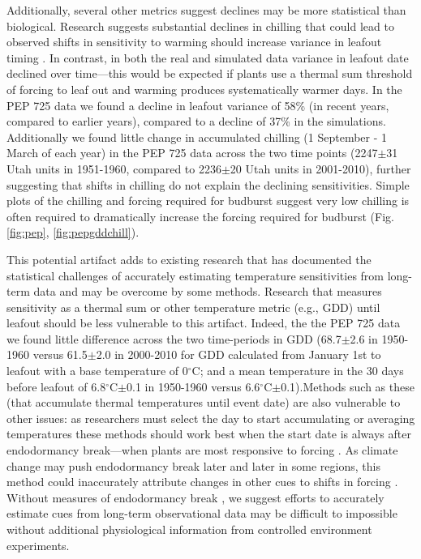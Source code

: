 \documentclass{article}
\begin{document}
\par Additionally, several other metrics suggest declines may be more statistical than biological. Research suggests substantial declines in chilling that could lead to observed shifts in sensitivity to warming should increase variance in leafout timing \citep{ford2016}. In contrast, in both the real and simulated data variance in leafout date declined over time---this would be expected if plants use a thermal sum threshold of forcing to leaf out and warming produces systematically warmer days. In the PEP 725 data we found a decline in leafout variance of 58\% (in recent years, compared to earlier years), compared to a decline of 37\% in the simulations. Additionally we found little change in accumulated chilling (1 September - 1 March of each year) in the PEP 725 data across the two time points (2247$\pm$31 Utah units in 1951-1960, compared to 2236$\pm$20 Utah units in 2001-2010), further suggesting that shifts in chilling do not explain the declining sensitivities. Simple plots of the chilling and forcing required for budburst suggest very low chilling is often required to dramatically increase the forcing required for budburst (Fig. \ref{fig:pep}, \ref{fig:pepgddchill}). 

\par This potential artifact adds to existing research that has documented the statistical challenges of accurately estimating temperature sensitivities from long-term data \citep{gusewell2017,clark2014a} and may be overcome by some methods. Research that measures sensitivity as a thermal sum or other temperature metric (e.g., GDD) until leafout should be less vulnerable to this artifact. Indeed, the the PEP 725 data we found little difference across the two time-periods in GDD (68.7$\pm$2.6 in 1950-1960 versus 61.5$\pm$2.0 in 2000-2010 for GDD calculated from January 1st to leafout with a base temperature of 0$^{\circ}$C; and a mean temperature in the 30 days before leafout of 6.8$^{\circ}$C$\pm$0.1 in 1950-1960 versus 6.6$^{\circ}$C$\pm$0.1).Methods such as these (that accumulate thermal temperatures until event date) are also vulnerable to other issues: as researchers must select the day to start accumulating or averaging temperatures these methods should work best when the start date is always after endodormancy break---when plants are most responsive to forcing \citep{chuine2016}. As climate change may push endodormancy break later and later in some regions, this method could inaccurately attribute changes in other cues to shifts in forcing \citep{gusewell2017}. Without measures of endodormancy break \citep{chuine2016}, we suggest efforts to accurately estimate cues from long-term observational data may be difficult to impossible without additional physiological information from controlled environment experiments.
\end{document}
